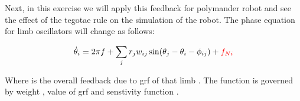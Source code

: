 \documentclass{cmc}
\begin{document}
 Next, in this exercise we will apply this feedback for polymander robot and see the effect of the tegotae rule on the simulation of the robot. The phase equation
 for limb oscillators will change as follows:

\begin{equation}
  \label{eq:dphase-grf}
  \dot{\theta}_i = 2 \pi f + \sum_j r_j w_{ij} \sin(\theta_j - \theta_i - \phi_{ij}) + \text{\textcolor{red}{$f_{N i}$}}
\end{equation}


Where  is the overall feedback due to grf of that limb . The function is
governed by weight \corr{$\sigma$}, value of grf  and senstivity function .
\end{document}

